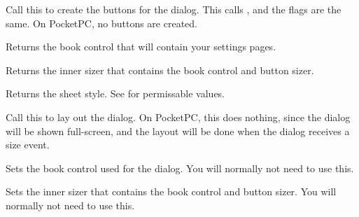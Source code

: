 
Call this to create the buttons for the dialog. This calls , and
the flags are the same. On PocketPC, no buttons are created.

\label{wxpropertysheetdialoggetbookctrl}


Returns the book control that will contain your settings pages.

\label{wxpropertysheetdialoggetinnersizer}


Returns the inner sizer that contains the book control and button sizer.

\label{wxpropertysheetdialoggetsheetstyle}


Returns the sheet style. See  for
permissable values.

\label{wxpropertysheetdialoglayoutdialog}


Call this to lay out the dialog. On PocketPC, this does nothing, since the dialog will be shown
full-screen, and the layout will be done when the dialog receives a size event.

\label{wxpropertysheetdialogsetbookctrl}


Sets the book control used for the dialog. You will normally not need to use this.

\label{wxpropertysheetdialogsetinnersizer}


Sets the inner sizer that contains the book control and button sizer. You will normally not need to use this.

\label{wxpropertysheetdialogsetsheetstyle}


